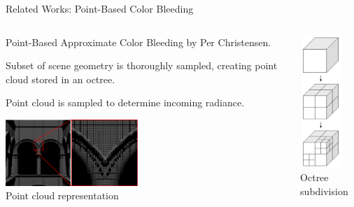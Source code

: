 \documentclass[10pt,compress,professionalfont]{beamer}
\begin{document}
\begin{frame}{Related Works: Point-Based Color Bleeding}



    \begin{columns}
        \begin{column}{0.7\textwidth}

    Point-Based Approximate Color Bleeding by Per Christensen.\\
    \vspace{6mm}

    Subset of scene geometry is thoroughly sampled, creating point cloud stored in an octree.\\
    \vspace{6mm}

    Point cloud is sampled to determine incoming radiance.

    \vspace{4mm}
    {\centering
    \includegraphics[width=50mm]{../img/pcloud}\\
    {\centering\scriptsize Point cloud representation\\}
    }

        \end{column}
        \begin{column}{0.3\textwidth}
            {\centering
            \includegraphics[height=50mm]{../img/external/octree}\\
            }
            {\centering\scriptsize Octree subdivision\\}
        \end{column}
    \end{columns}

\end{frame}
\end{document}
